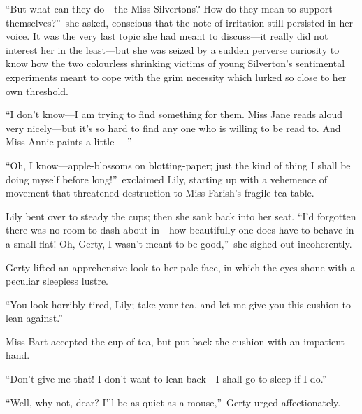 \documentclass[12pt,a4paper]{book}
\begin{document}
``But what can they do---the Miss Silvertons? How do they mean to
support themselves?''\ she asked, conscious that the note of
irritation still persisted in her voice. It was the very last
topic she had meant to discuss---it really did not interest her in
the least---but she was seized by a sudden perverse curiosity to
know how the two colourless shrinking victims of young
Silverton's sentimental experiments meant to cope with the grim
necessity which lurked so close to her own threshold.





``I don't know---I am trying to find something for them. Miss Jane
reads aloud very nicely---but it's so hard to find any one who is
willing to be read to. And Miss Annie paints a little----''





``Oh, I know---apple-blossoms on blotting-paper; just the kind of
thing I shall be doing myself before long!''\ exclaimed Lily,
starting up with a vehemence of movement that threatened
destruction to Miss Farish's fragile tea-table.





Lily bent over to steady the cups; then she sank back into her
seat. ``I'd forgotten there was no room to dash about in---how
beautifully one does have to behave in a small flat! Oh, Gerty, I
wasn't meant to be good,''\ she sighed out incoherently.





Gerty lifted an apprehensive look to her pale face, in which the
eyes shone with a peculiar sleepless lustre.





``You look horribly tired, Lily; take your tea, and let me give
you this cushion to lean against.''





Miss Bart accepted the cup of tea, but put back the cushion with
an impatient hand.





``Don't give me that! I don't want to lean back---I shall go to
sleep if I do.''





``Well, why not, dear? I'll be as quiet as a mouse,''\ Gerty urged
affectionately.
\end{document}
